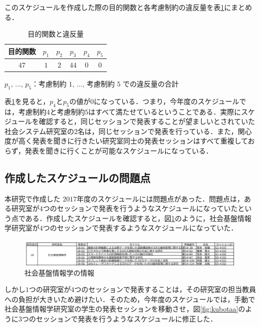 \documentclass[a4paper,12pt,fleqn]{jarticle}
\begin{document}
このスケジュールを作成した際の目的関数と各考慮制約の違反量を表\ref{tb:2017}にまとめる．
\begin{table}[H]
  \begin{center}
    \caption{目的関数と違反量}
    \label{tb:2017}
    \begin{tabular}{cccccc} \toprule
    目的関数 & $p_1$ & $p_2$ & $p_3$ & $p_4$ & $p_5$ \\ \hline
    $47$ & $1$ & $2$ & $44$ & $0$ & $0$\\ \toprule
    \end{tabular}
    \end{center}
    \hspace{3cm} $p_1$, ..., $p_5$：考慮制約 $1$, ..., 考慮制約 $5$ での違反量の合計
\end{table}
表\ref{tb:2017}を見ると，$p_4$と$p_5$の値が$0$になっている．つまり，今年度のスケジュールでは，考慮制約$4$と考慮制約$5$はすべて満たせているということである．実際にスケジュールを確認すると，同じセッションで発表することが望ましいとされていた社会システム研究室の$2$名は，同じセッションで発表を行っている．また，関心度が高く発表を聞きに行きたい研究室同士の発表セッションはすべて重複しておらず，発表を聞きに行くことが可能なスケジュールになっている．

\subsection{作成したスケジュールの問題点}
本研究で作成した $2017$年度のスケジュールには問題点があった．問題点は，ある研究室が$4$つのセッションで発表を行うようなスケジュールになっていたという点である．作成したスケジュールを確認すると，図\ref{fig:kubota}のように，社会基盤情報学研究室が$4$つのセッションで発表するようなスケジュールになっていた．

\begin{figure}[H]
  \begin{center}
    \includegraphics[scale=0.75]{kubota.png}
    \caption{社会基盤情報学の情報}
    \label{fig:kubota}
  \end{center}
\end{figure}

しかし$1$つの研究室が$4$つのセッションで発表することは，その研究室の担当教員への負担が大きいため避けたい．そのため，今年度のスケジュールでは，手動で社会基盤情報学研究室の学生の発表セッションを移動させ，図\ref{fig:kubotaa}のように$3$つのセッションで発表を行うようなスケジュールに修正した．
\end{document}
